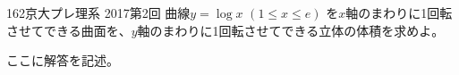 \begin{prob}{162}{}{京大プレ理系 2017第2回}
 曲線$y=\log x$ $(1\le x \le e)$ を$x$軸のまわりに1回転させてできる曲面を、$y$軸のまわりに1回転させてできる立体の体積を求めよ。
\end{prob}
ここに解答を記述。